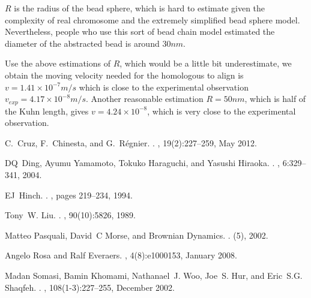 \documentclass{article}
\begin{document}
$R$ is the radius of the bead sphere, which is hard to estimate given the complexity of real chromosome and the extremely simplified bead sphere model.
Nevertheless, people who use this sort of bead chain model estimated the diameter of the abstracted bead is around $30nm$\cite{Rosa2008}.

Use the above estimations of $R$, which would be a little bit underestimate, we obtain the moving velocity needed for the homologous to align is $v = 1.41\times10^{-7} m/s$ which is close to the experimental observation $v_{exp} = 4.17\times10^{-8}m/s$.
Another reasonable estimation $R=50nm$, which is half of the Kuhn length, gives $v = 4.24\times10^{-8}$, which is very close to the experimental observation.

% 


\begin{thebibliography}{1}

C.~Cruz, F.~Chinesta, and G.~R\'{e}gnier.
.
,
  19(2):227--259, May 2012.

DQ~Ding, Ayumu Yamamoto, Tokuko Haraguchi, and Yasushi Hiraoka.
.
, 6:329--341, 2004.

EJ~Hinch.
.
, pages 219--234, 1994.

Tony~W. Liu.
.
, 90(10):5826, 1989.

Matteo Pasquali, David~C Morse, and Brownian Dynamics.
.
(5), 2002.

Angelo Rosa and Ralf Everaers.
, 4(8):e1000153, January 2008.

Madan Somasi, Bamin Khomami, Nathanael~J. Woo, Joe~S. Hur, and Eric~S.G.
  Shaqfeh.
.
, 108(1-3):227--255,
  December 2002.

\end{thebibliography}
\end{document}
